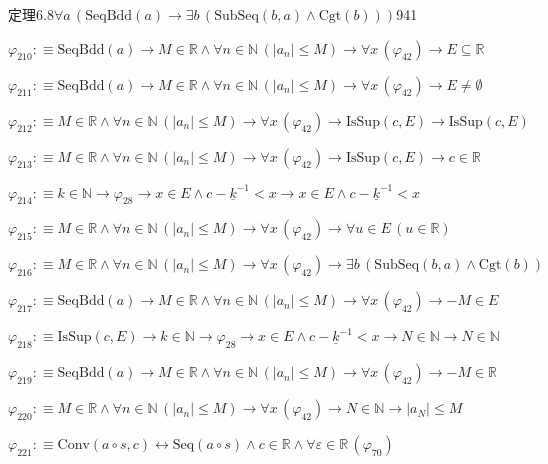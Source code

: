 \begin{fullproof}{定理6.8}{$\forall a\,(\mathrm{SeqBdd}(a) \to \exists b\,(\mathrm{SubSeq}(b,a) \land \mathrm{Cgt}(b)))$}{941}
\begin{abbrevlist}
\item $\varphi_{210} :\equiv \mathrm{SeqBdd}(a) \to M \in \mathbb{R} \land \forall n \in \mathbb{N}\,(\lvert a_{n} \rvert \leq M) \to \forall x\,(\varphi_{42}) \to E \subseteq \mathbb{R}$
\item $\varphi_{211} :\equiv \mathrm{SeqBdd}(a) \to M \in \mathbb{R} \land \forall n \in \mathbb{N}\,(\lvert a_{n} \rvert \leq M) \to \forall x\,(\varphi_{42}) \to E \neq \emptyset$
\item $\varphi_{212} :\equiv M \in \mathbb{R} \land \forall n \in \mathbb{N}\,(\lvert a_{n} \rvert \leq M) \to \forall x\,(\varphi_{42}) \to \mathrm{IsSup}(c,E) \to \mathrm{IsSup}(c,E)$
\item $\varphi_{213} :\equiv M \in \mathbb{R} \land \forall n \in \mathbb{N}\,(\lvert a_{n} \rvert \leq M) \to \forall x\,(\varphi_{42}) \to \mathrm{IsSup}(c,E) \to c \in \mathbb{R}$
\item $\varphi_{214} :\equiv k \in \mathbb{N} \to \varphi_{28} \to x \in E \land c - \underline{k}^{-1} < x \to x \in E \land c - \underline{k}^{-1} < x$
\item $\varphi_{215} :\equiv M \in \mathbb{R} \land \forall n \in \mathbb{N}\,(\lvert a_{n} \rvert \leq M) \to \forall x\,(\varphi_{42}) \to \forall u \in E\,(u \in \mathbb{R})$
\item $\varphi_{216} :\equiv M \in \mathbb{R} \land \forall n \in \mathbb{N}\,(\lvert a_{n} \rvert \leq M) \to \forall x\,(\varphi_{42}) \to \exists b\,(\mathrm{SubSeq}(b,a) \land \mathrm{Cgt}(b))$
\item $\varphi_{217} :\equiv \mathrm{SeqBdd}(a) \to M \in \mathbb{R} \land \forall n \in \mathbb{N}\,(\lvert a_{n} \rvert \leq M) \to \forall x\,(\varphi_{42}) \to -M \in E$
\item $\varphi_{218} :\equiv \mathrm{IsSup}(c,E) \to k \in \mathbb{N} \to \varphi_{28} \to x \in E \land c - \underline{k}^{-1} < x \to N \in \mathbb{N} \to N \in \mathbb{N}$
\item $\varphi_{219} :\equiv \mathrm{SeqBdd}(a) \to M \in \mathbb{R} \land \forall n \in \mathbb{N}\,(\lvert a_{n} \rvert \leq M) \to \forall x\,(\varphi_{42}) \to -M \in \mathbb{R}$
\item $\varphi_{220} :\equiv M \in \mathbb{R} \land \forall n \in \mathbb{N}\,(\lvert a_{n} \rvert \leq M) \to \forall x\,(\varphi_{42}) \to N \in \mathbb{N} \to \lvert a_{N} \rvert \leq M$
\item $\varphi_{221} :\equiv \mathrm{Conv}(a \circ s,c) \leftrightarrow \mathrm{Seq}(a \circ s) \land c \in \mathbb{R} \land \forall \varepsilon \in \mathbb{R}\,(\varphi_{70})$

\end{abbrevlist}
\end{fullproof}
